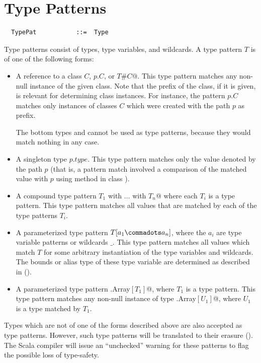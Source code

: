 
\section{Type Patterns}\label{sec:type-patterns}

\syntax\begin{lstlisting}
  TypePat           ::=  Type
\end{lstlisting}
Type patterns consist of types, type variables, and wildcards. 
A type pattern $T$ is of one of the following  forms:
\begin{itemize}
\item A reference to a class $C$, $p.C$, or \lstinline@$T$#$C$@.  This
type pattern matches any non-null instance of the given class. 
Note that the prefix of the class, if it is given, is relevant for determining
class instances. For instance, the pattern $p.C$ matches only
instances of classes $C$ which were created with the path $p$ as
prefix.

The bottom types  and  cannot
be used as type patterns, because they would match nothing in any case.  
\item
A singleton type $p.type$. This type pattern matches only the value
denoted by the path $p$ (that is, a pattern match involved a
comparison of the matched value with $p$ using method  in class
).
\item
A compound type pattern \lstinline@$T_1$ with $\ldots$ with $T_n$@ where each $T_i$ is a
type pattern. This type pattern matches all values that are matched by each of
the type patterns $T_i$.
\item 
A parameterized type pattern $T[a_1 \commadots a_n]$, where the $a_i$
are type variable patterns or wildcards $\_$. 
This type pattern matches all values which match $T$ for
some arbitrary instantiation of the type variables and wildcards. The
bounds or alias type of these type variable are determined as
described in ().
\item
A parameterized type pattern \lstinline@scala.Array$[T_1]$@, where
$T_1$ is a type pattern. This type pattern matches any non-null instance
of type \lstinline@scala.Array$[U_1]$@, where $U_1$ is a type matched by $T_1$.
\end{itemize}
Types which are not of one of the forms described above are also 
accepted as type patterns. However, such type patterns will be translated to their
erasure ().  The Scala
compiler will issue an ``unchecked'' warning for these patterns to
flag the possible loss of type-safety.

